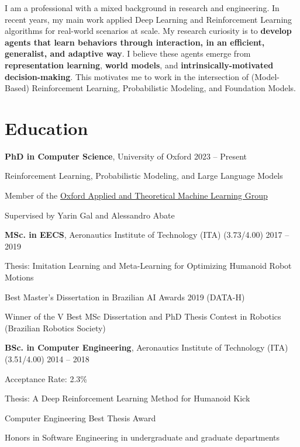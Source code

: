 \documentclass[11pt,letter,sans,colorlinks,linkcolor=true]{moderncv}
\begin{document}
\hypersetup{allcolors=color3}
\makecvtitle

\vspace{-1cm}

    \vspace{18pt} \small{ I am a professional with a mixed background in research and engineering. In recent years, my main work applied Deep Learning and Reinforcement Learning algorithms for real-world scenarios at scale. My research curiosity is to \textbf{develop agents that learn behaviors through interaction, in an efficient, generalist, and adaptive way}. I believe these agents emerge from \textbf{representation learning}, \textbf{world models}, and \textbf{intrinsically-motivated decision-making}. This motivates me to work in the intersection of (Model-Based) Reinforcement Learning, Probabilistic Modeling, and Foundation Models. }


\section{Education}
    \textbf{PhD in Computer Science}, University of Oxford
    \hfill 2023 -- Present \par
Reinforcement Learning, Probabilistic Modeling, and Large Language Models \par
Member of the \href{https://oatml.cs.ox.ac.uk/}{Oxford Applied and Theoretical Machine Learning Group} \par
Supervised by Yarin Gal and Alessandro Abate \par




  \vspace{3mm}
    \textbf{MSc. in EECS}, Aeronautics Institute of Technology (ITA)
        (3.73/4.00)
    \hfill 2017 -- 2019 \par
Thesis: Imitation Learning and Meta-Learning for Optimizing Humanoid Robot Motions \par
Best Master's Dissertation in Brazilian AI Awards 2019 (DATA-H) \par
Winner of the V Best MSc Dissertation and PhD Thesis Contest in Robotics (Brazilian Robotics Society) \par




  \vspace{3mm}
    \textbf{BSc. in Computer Engineering}, Aeronautics Institute of Technology (ITA)
        (3.51/4.00)
    \hfill 2014 -- 2018 \par
Acceptance Rate: 2.3\% \par
Thesis: A Deep Reinforcement Learning Method for Humanoid Kick \par
Computer Engineering Best Thesis Award \par
Honors in Software Engineering in undergraduate and graduate departments \par
\end{document}
